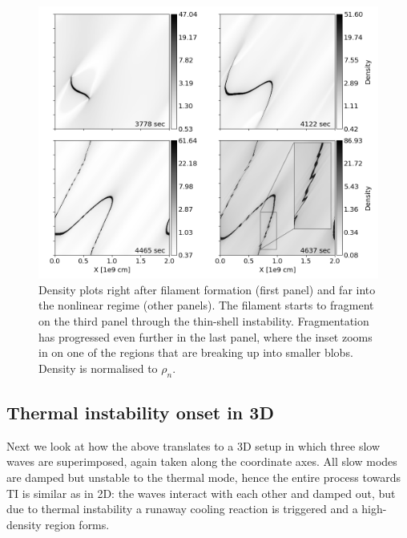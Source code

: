 \begin{figure}[t]
  \centering
  \includegraphics[width=\textwidth]{2d_density_fragmentation.png}
  \caption{
    Density plots right after filament formation (first panel) and far into the nonlinear regime (other panels). The filament starts to fragment on the third panel through the thin-shell instability. Fragmentation has progressed even further in the last panel, where the inset zooms in on one of the regions that are breaking up into smaller blobs. Density is normalised to $\rho_n$.
  }
  \label{fig: 2d_density_fragmentation}
\end{figure}


\subsection{Thermal instability onset in 3D}
Next we look at how the above translates to a 3D setup in which three slow waves are superimposed, again taken along the coordinate axes. All slow modes are damped but unstable to the thermal mode, hence the entire process towards TI is similar as in 2D: the waves interact with each other and damped out, but due to thermal instability a runaway cooling reaction is triggered and a high-density region forms.

